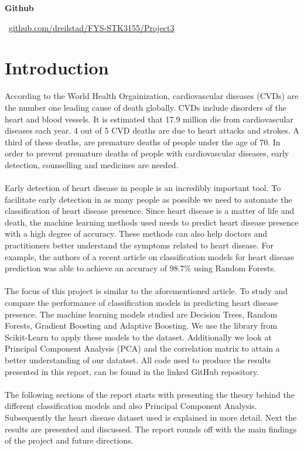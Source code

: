 \documentclass[a4paper,twocolumn]{article}
\begin{document}
\raggedbottom
\begin{center}
    \small \textbf{Github}
    
    \vspace{0.2cm}
    
    \faGithub \ \small \href{https://github.com/dreilstad/FYS-STK3155/tree/master/Project3}{github.com/dreilstad/FYS-STK3155/Project3}
\end{center}
\vspace{0.5cm}
\section{Introduction}
According to the World Health Orgainization\cite{who}, cardiovascular diseases (CVDs) are the number one leading cause of death globally. CVDs include disorders of the heart and blood vessels. It is estimated that 17.9 million die from cardiovascular diseases each year. 4 out of 5 CVD deaths are due to heart attacks and strokes. A third of these deaths, are premature deaths of people under the age of 70. In order to prevent premature deaths of people with cardiovascular diseases, early detection, counselling and medicines are needed.\\
\\
Early detection of heart disease in people is an incredibly important tool. To facilitate early detection in as many people as possible we need to automate the classification of heart disease presence. Since heart disease is a matter of life and death, the machine learning methods used needs to predict heart disease presence with a high degree of accuracy. These methods can also help doctors and practitioners better understand the symptoms related to heart disease. For example, the authors of a recent article\cite{introarticle} on classification models for heart disease prediction was able to achieve an accuracy of $98.7\%$ using Random Forests.\\
\\
The focus of this project is similar to the aforementioned article. To study and compare the performance of classification models in predicting heart disease presence. The machine learning models studied are Decision Trees, Random Forests, Gradient Boosting and Adaptive Boosting. We use the library from Scikit-Learn\cite{scikit} to apply these models to the dataset. Additionally we look at Principal Component Analysis (PCA) and the correlation matrix to attain a better understanding of our datatset. All code used to produce the results presented in this report, can be found in the linked GitHub repository.\\
\\
The following sections of the report starts with presenting the theory behind the different classification models and also Principal Component Analysis. Subsequently the heart disease dataset used is explained in more detail. Next the results are presented and discussed. The report rounds off with the main findings of the project and future directions.
\end{document}
